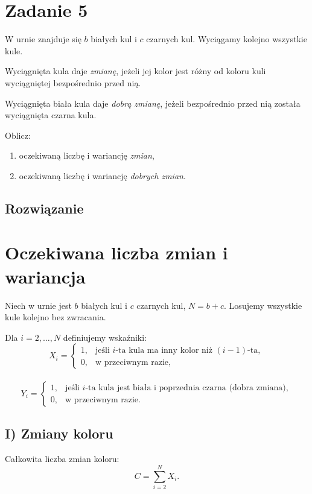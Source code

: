 \section{Zadanie 5}
W urnie znajduje się \(b\) białych kul i \(c\) czarnych kul. Wyciągamy kolejno wszystkie kule.

Wyciągnięta kula daje \emph{zmianę}, jeżeli jej kolor jest różny od koloru kuli wyciągniętej bezpośrednio przed nią.

Wyciągnięta biała kula daje \emph{dobrą zmianę}, jeżeli bezpośrednio przed nią została wyciągnięta czarna kula.

\bigskip

Oblicz:
\begin{enumerate}
	\item oczekiwaną liczbę i wariancję \emph{zmian},
	\item oczekiwaną liczbę i wariancję \emph{dobrych zmian}.
\end{enumerate}


\subsection*{Rozwiązanie}
\section*{Oczekiwana liczba zmian i wariancja}

Niech w urnie jest \(b\) białych kul i \(c\) czarnych kul, \(N=b+c\). Losujemy wszystkie kule kolejno bez zwracania.

Dla \(i=2,\dots,N\) definiujemy wskaźniki:
\[
	X_i =
	\begin{cases}
		1, & \text{jeśli } i\text{-ta kula ma inny kolor niż }(i-1)\text{-ta}, \\
		0, & \text{w przeciwnym razie},
	\end{cases}
\]
\\
\[
	Y_i =
	\begin{cases}
		1, & \text{jeśli } i\text{-ta kula jest biała i poprzednia czarna (dobra zmiana)}, \\
		0, & \text{w przeciwnym razie}.
	\end{cases}
\]

\subsection*{I) Zmiany koloru}

Całkowita liczba zmian koloru:
\[
	C = \sum_{i=2}^N X_i.
\]

